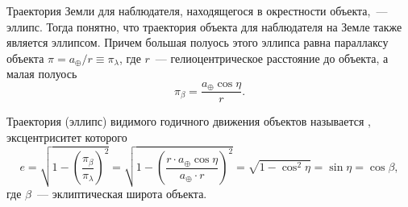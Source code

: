 Траектория Земли для наблюдателя, находящегося в окрестности объекта,~--- эллипс. Тогда понятно, что траектория объекта для наблюдателя на Земле также является эллипсом. Причем большая полуось этого эллипса равна параллаксу объекта $\pi = a_\oplus / r \equiv \pi_\lambda$, где $r$~--- гелиоцентрическое расстояние до объекта, а малая полуось
\begin{equation*}
	\pi_\beta = \frac{a_\oplus \cos \eta}{r}.
\end{equation*}

Траектория (эллипс) видимого годичного движения объектов называется , эксцентриситет которого
\begin{equation*}
	e
	= \sqrt{1 - \left(\frac{\pi_\beta}{\pi_\lambda} \right)^2}
	= \sqrt{1 - \left( \frac{r \cdot a_\oplus \cos \eta}{a_\oplus \cdot r}\right)^2}
	= \sqrt{1 - \cos^2 \eta} = \sin \eta = \cos \beta,
\end{equation*}
где $\beta$~--- эклиптическая широта объекта.

